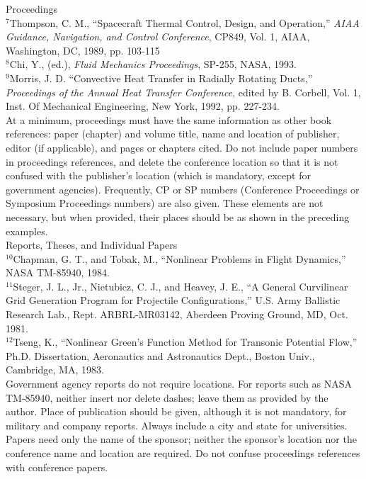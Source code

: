 Proceedings \\
$^7$Thompson, C. M., “Spacecraft Thermal Control, Design, and Operation,” \textit{AIAA Guidance, Navigation, and Control Conference}, CP849, Vol. 1, AIAA, Washington, DC, 1989, pp. 103-115 \\
$^8$Chi, Y., (ed.), \textit{Fluid Mechanics Proceedings}, SP-255, NASA, 1993. \\
$^9$Morris, J. D. “Convective Heat Transfer in Radially Rotating Ducts,” \textit{Proceedings of the Annual Heat Transfer Conference}, edited by B. Corbell, Vol. 1, Inst. Of Mechanical Engineering, New York, 1992, pp. 227-234. \\

At a minimum, proceedings must have the same information as other book references: paper (chapter) and volume title, name and location of publisher, editor (if applicable), and pages or chapters cited. Do not include paper numbers in proceedings references, and delete the conference location so that it is not confused with the publisher’s location (which is mandatory, except for government agencies). Frequently, CP or SP numbers (Conference Proceedings or Symposium Proceedings numbers) are also given. These elements are not necessary, but when provided, their places should be as shown in the preceding examples. \\

Reports, Theses, and Individual Papers \\
$^{10}$Chapman, G. T., and Tobak, M., “Nonlinear Problems in Flight Dynamics,” NASA TM-85940, 1984. \\
$^{11}$Steger, J. L., Jr., Nietubicz, C. J., and Heavey, J. E., “A General Curvilinear Grid Generation Program for Projectile Configurations,” U.S. Army Ballistic Research Lab., Rept. ARBRL-MR03142, Aberdeen Proving Ground, MD, Oct. 1981. \\
$^{12}$Tseng, K., “Nonlinear Green’s Function Method for Transonic Potential Flow,” Ph.D. Dissertation, Aeronautics and Astronautics Dept., Boston Univ., Cambridge, MA, 1983. \\

Government agency reports do not require locations. For reports such as NASA TM-85940, neither insert nor delete dashes; leave them as provided by the author. Place of publication should be given, although it is not mandatory, for military and company reports. Always include a city and state for universities. Papers need only the name of the sponsor; neither the sponsor’s location nor the conference name and location are required. Do not confuse proceedings references with conference papers. \\


